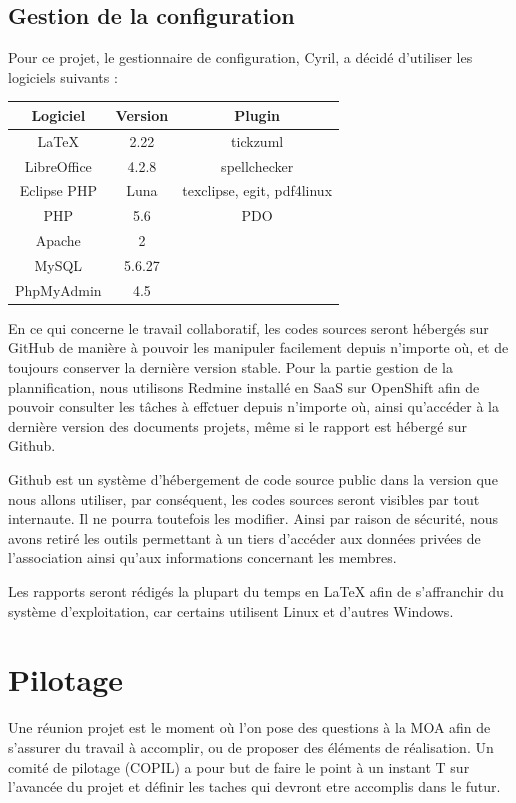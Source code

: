 \documentclass[11pt]{report}
\begin{document}
\subsection{Gestion de la configuration}
Pour ce projet, le gestionnaire de configuration, Cyril, a décidé d'utiliser
les logiciels suivants : \\ 
\par 
\begin{tabular}{ | c | c | c | }
\hline 
   Logiciel & Version & Plugin  \\ \hline 
   LaTeX & 2.22 & tickzuml \\ \hline 
   LibreOffice & 4.2.8 & spellchecker \\ \hline 
   Eclipse PHP & Luna & texclipse, egit, pdf4linux \\ \hline
   PHP & 5.6 & PDO \\ \hline
   Apache & 2 & \\ \hline
   MySQL & 5.6.27 & \\ \hline
   PhpMyAdmin & 4.5 & \\ \hline
 \end{tabular}
 
 \par En ce qui concerne le travail collaboratif, les codes sources seront
 hébergés sur GitHub de manière à pouvoir les manipuler facilement depuis
 n'importe où, et de toujours conserver la dernière version stable. Pour la
 partie gestion de la plannification, nous utilisons Redmine installé en SaaS
 sur OpenShift afin de pouvoir consulter les tâches à effctuer depuis n'importe
 où, ainsi qu'accéder à la dernière version des documents projets, même si le
 rapport est hébergé sur Github.
 \par Github est un système d'hébergement de code source public dans la version 
 que nous allons utiliser, par conséquent, les codes sources seront visibles 
 par tout internaute. Il ne pourra toutefois les modifier. Ainsi par raison de
 sécurité, nous avons retiré les outils permettant à un tiers d'accéder aux
 données privées de l'association ainsi qu'aux informations concernant les
 membres.
 \par Les rapports seront rédigés la plupart du temps en LaTeX afin de
 s'affranchir du système d'exploitation, car certains utilisent Linux et
 d'autres Windows. 

\section{Pilotage}
 Une réunion projet est le moment où l'on pose des questions à la MOA afin de
s'assurer du travail à accomplir, ou de proposer des éléments de réalisation.
 Un comité de pilotage (COPIL) a pour but de faire le point à un instant T sur
l'avancée du projet et définir les taches qui devront etre accomplis dans le futur. \\
\end{document}
